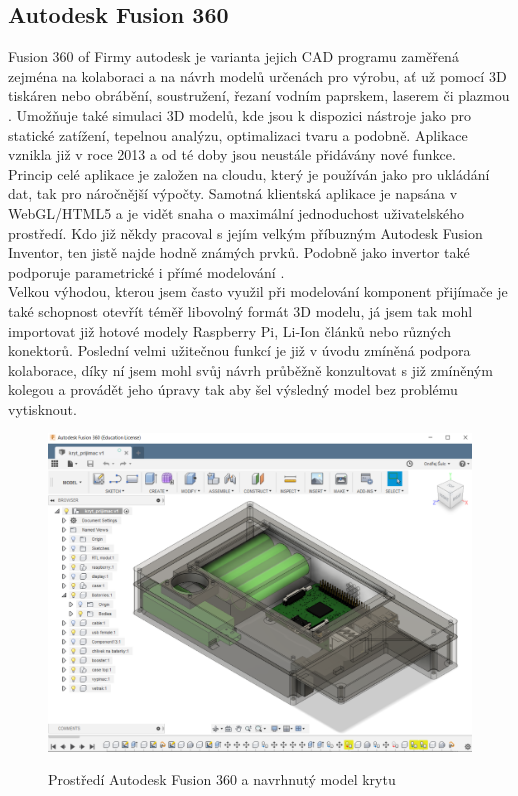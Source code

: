 \documentclass{ctuthesis}
\begin{document}
\subsection{Autodesk Fusion 360}
Fusion 360 of Firmy autodesk je varianta jejich CAD programu zaměřená zejména na kolaboraci a na návrh modelů určenách pro výrobu, ať už pomocí 3D tiskáren nebo obrábění, soustružení, řezaní vodním paprskem, laserem či plazmou \cite{autodesk2018}. Umožňuje také simulaci 3D modelů, kde jsou k dispozici nástroje jako pro statické zatížení, tepelnou analýzu, optimalizaci tvaru a podobně. Aplikace vznikla již v roce 2013 a od té doby jsou neustále přidávány nové funkce. \\
Princip celé aplikace je založen na cloudu, který je používán jako pro ukládání dat, tak pro náročnější výpočty. Samotná klientská aplikace je napsána v WebGL/HTML5 a je vidět snaha o maximální jednoduchost uživatelského prostředí. Kdo již někdy pracoval s jejím velkým příbuzným Autodesk Fusion Inventor, ten jistě najde hodně známých prvků. Podobně jako invertor také podporuje parametrické  i přímé modelování \cite{cadstudio}. \\
Velkou výhodou, kterou jsem často využil při modelování komponent přijímače je také schopnost otevřít téměř libovolný formát 3D modelu, já jsem tak mohl importovat již hotové modely Raspberry Pi, Li-Ion článků nebo různých konektorů. Poslední velmi užitečnou funkcí je již v úvodu zmíněná podpora kolaborace, díky ní jsem mohl svůj návrh průběžně konzultovat s již zmíněným kolegou a provádět jeho úpravy tak aby šel výsledný model bez problému vytisknout.
\begin{figure}
\caption{Prostředí Autodesk Fusion 360 a navrhnutý model krytu}
\includegraphics[width=1\textwidth]{./images/3dmodel.png}
\label{3dmodel}
\end{figure}
\end{document}
